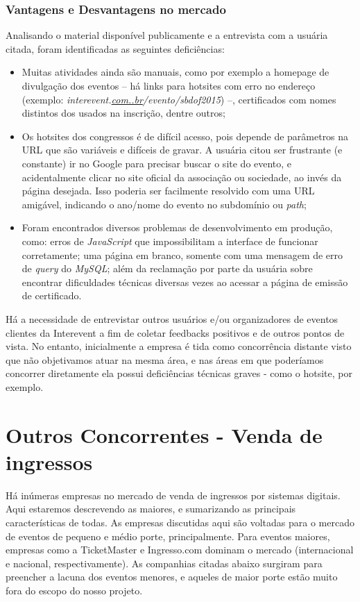 \documentclass[a4paper]{abntex2}
\begin{document}
\subsubsection*{Vantagens e Desvantagens no mercado}
Analisando o material disponível publicamente e a entrevista com a usuária citada, foram identificadas as seguintes deficiências:
\begin{itemize}
	\item Muitas atividades ainda são manuais, como por exemplo a homepage de divulgação dos eventos -- há links para hotsites com erro no endereço (exemplo: \emph{interevent.\underline{com..br}/evento/sbdof2015}) --, certificados com nomes distintos dos usados na inscrição, dentre outros;
	\item Os hotsites dos congressos é de difícil acesso, pois depende de parâmetros na URL que são variáveis e difíceis de gravar. A usuária citou ser frustrante (e constante) ir no Google para precisar buscar o site do evento, e acidentalmente clicar no site oficial da associação ou sociedade, ao invés da página desejada. Isso poderia ser facilmente resolvido com uma URL amigável, indicando o ano/nome do evento no subdomínio ou \emph{path};
	\item Foram encontrados diversos problemas de desenvolvimento em produção, como: erros de \emph{JavaScript} que impossibilitam a interface de funcionar corretamente; uma página em branco, somente com uma mensagem de erro de \emph{query} do \emph{MySQL}; além da reclamação por parte da usuária sobre encontrar dificuldades técnicas diversas vezes ao acessar a página de emissão de certificado.
\end{itemize}

Há a necessidade de entrevistar outros usuários e/ou organizadores de eventos clientes da Interevent a fim de coletar feedbacks positivos e de outros pontos de vista. No entanto, inicialmente a empresa é tida como concorrência distante visto que não objetivamos atuar na mesma área, e nas áreas em que poderíamos concorrer diretamente ela possui deficiências técnicas graves - como o hotsite, por exemplo.

\section{Outros Concorrentes - Venda de ingressos}
Há inúmeras empresas no mercado de venda de ingressos por sistemas digitais. Aqui estaremos descrevendo as maiores, e sumarizando as principais características de todas. As empresas discutidas aqui são voltadas para o mercado de eventos de pequeno e médio porte, principalmente. Para eventos maiores, empresas como a TicketMaster e Ingresso.com dominam o mercado (internacional e nacional, respectivamente). As companhias citadas abaixo surgiram para preencher a lacuna dos eventos menores, e aqueles de maior porte estão muito fora do escopo do nosso projeto.
\end{document}
